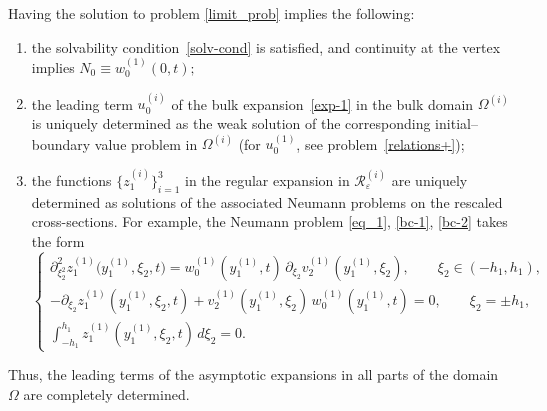 \documentclass[reqno]{amsart}            %
\numberwithin{equation}{section}
\begin{document}
	Having the solution to problem \eqref{limit_prob} implies the following:
	\begin{enumerate}
		\item 
		the solvability condition~\eqref{solv-cond} is satisfied, 
		and continuity at the vertex implies $N_0 \equiv w_0^{(1)}(0, t);$ 
		\item 
		the leading term $u_0^{(i)}$ of the bulk expansion~\eqref{exp-1} in the
		bulk domain $\Omega^{(i)}$ is uniquely determined as the weak solution of the
		corresponding initial--boundary value problem in $\Omega^{(i)}$ (for
		$u_0^{(1)}$, see problem~\eqref{relations+});
		\item 
		the functions $\{z_1^{(i)}\}_{i=1}^3$ in the regular expansion in  $\mathcal{R}^{(i)}_\varepsilon$ are uniquely determined as
		solutions of the associated Neumann problems on the rescaled cross-sections.
		For example, the Neumann problem \eqref{eq_1}, \eqref{bc-1}, \eqref{bc-2}
		takes the form
		\begin{equation}\label{prob-z-1}
			\left\{
			\begin{array}{l}
				\partial_{\xi_2^2}^2 z^{(1)}_1\big(y^{(1)}_1,\xi_2,t\big)
				= w^{(1)}_0(y^{(1)}_1,t)\,\partial_{\xi_2} v_2^{(1)}(y^{(1)}_1,\xi_2),
				\qquad \xi_2\in(-h_1,h_1),
				\\[2mm]
				-\partial_{\xi_2} z^{(1)}_1(y^{(1)}_1,\xi_2,t)
				+ v_2^{(1)}(y^{(1)}_1,\xi_2)\, w^{(1)}_0(y^{(1)}_1,t)
				=0,
				\qquad \xi_2=\pm h_1,
				\\[2mm]
				\displaystyle \int_{-h_1}^{h_1} z_1^{(1)}(y^{(1)}_1,\xi_2,t)\,d\xi_2 = 0.
			\end{array}
			\right.
		\end{equation}
	\end{enumerate}
	
	Thus, the leading terms of the asymptotic expansions in all parts of the
	domain $\Omega$ are completely determined.
	
	
\end{document}
